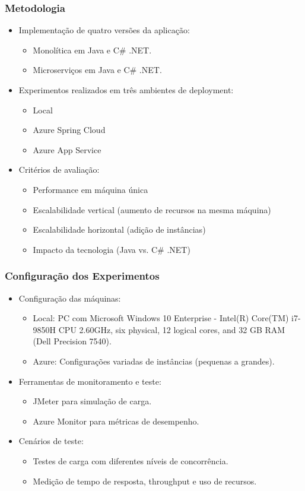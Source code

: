 \documentclass{beamer}
\begin{document}
\begin{frame}
\frametitle{Metodologia}
\begin{itemize}
    \item Implementação de quatro versões da aplicação:
    \begin{itemize}
        \item Monolítica em Java e C\# .NET.
        \item Microserviços em Java e C\# .NET.
    \end{itemize}
    \item Experimentos realizados em três ambientes de deployment:
    \begin{itemize}
        \item Local
        \item Azure Spring Cloud
        \item Azure App Service
    \end{itemize}
    \item Critérios de avaliação:
    \begin{itemize}
        \item Performance em máquina única
        \item Escalabilidade vertical (aumento de recursos na mesma máquina)
        \item Escalabilidade horizontal (adição de instâncias)
        \item Impacto da tecnologia (Java vs. C\# .NET)
    \end{itemize}
\end{itemize}
\end{frame}

\begin{frame}
\frametitle{Configuração dos Experimentos}
\begin{itemize}
    \item Configuração das máquinas:
    \begin{itemize}
        \item Local:  PC com Microsoft Windows 10 Enterprise - Intel(R) Core(TM) i7-9850H CPU 2.60GHz, six physical, 12 logical cores, and 32 GB RAM (Dell Precision 7540).
        \item Azure: Configurações variadas de instâncias (pequenas a grandes).
    \end{itemize}
    \item Ferramentas de monitoramento e teste:
    \begin{itemize}
        \item JMeter para simulação de carga.
        \item Azure Monitor para métricas de desempenho.
    \end{itemize}
    \item Cenários de teste:
    \begin{itemize}
        \item Testes de carga com diferentes níveis de concorrência.
        \item Medição de tempo de resposta, throughput e uso de recursos.
    \end{itemize}
\end{itemize}
\end{frame}
\end{document}
